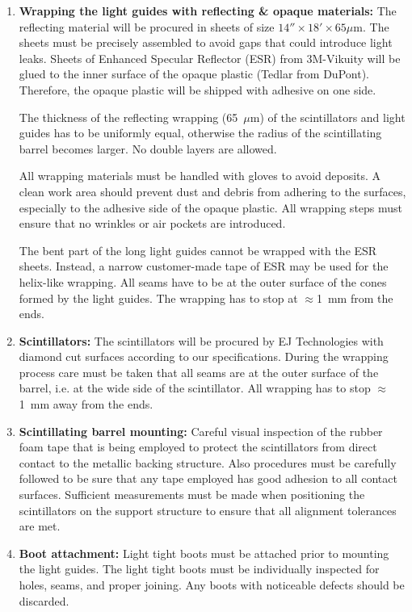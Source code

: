 \begin{enumerate}

\item \textbf{Wrapping the light guides with reflecting \& opaque materials:} 
The reflecting material will be procured in sheets of size
$14'' \times 18' \times 65 \mu$m.  The sheets must be precisely assembled to 
avoid gaps that could introduce light leaks.  Sheets of Enhanced Specular 
Reflector (ESR) from 3M-Vikuity will be glued to the inner surface of the 
opaque plastic (Tedlar from DuPont).  Therefore, the opaque plastic will be 
shipped with adhesive on one side.

The thickness of the reflecting wrapping (65~$\mu$m) of the scintillators and 
light guides has to be uniformly equal, otherwise the radius of the 
scintillating barrel becomes larger.  No double layers are allowed.

All wrapping materials must be handled with gloves to avoid deposits.  A 
clean work area should prevent dust and debris from adhering to the surfaces, 
especially to the adhesive side of the opaque plastic.  All wrapping steps 
must ensure that no wrinkles or air pockets are introduced.

The bent part of the long light guides cannot be wrapped with the ESR sheets. 
Instead, a narrow customer-made tape of ESR may be used for the helix-like 
wrapping.  All seams have to be at the outer surface of the cones formed by 
the light guides.  The wrapping has to stop at $\approx$1~mm from the ends.

\item \textbf{Scintillators:}
The scintillators will be procured by EJ Technologies with diamond cut 
surfaces according to our specifications.  During the wrapping process care
must be taken that all seams are at the outer surface of the barrel, i.e. at 
the wide side of the scintillator.  All wrapping has to stop $\approx$1~mm 
away from the ends.

\item \textbf{Scintillating barrel mounting:} 
Careful visual inspection of the rubber foam tape that is being employed to 
protect the scintillators from direct contact to the metallic backing 
structure.  Also procedures must be carefully followed to be sure that any 
tape employed has good adhesion to all contact surfaces.  Sufficient 
measurements must be made when positioning the scintillators on the support 
structure to ensure that all alignment tolerances are met.

\item \textbf{Boot attachment:}
Light tight boots must be attached prior to mounting the light guides.  The 
light tight boots must be individually inspected for holes, seams, and proper 
joining.  Any boots with noticeable defects should be discarded.


\end{enumerate}
